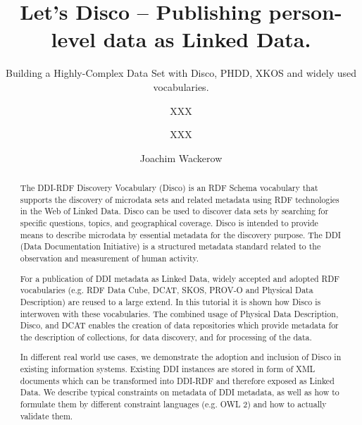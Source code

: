 \documentclass{llncs}
\begin{document}
%
%
\title{Let’s Disco – Publishing person-level data as Linked Data.}
\subtitle{Building a Highly-Complex Data Set with Disco, PHDD, XKOS and widely used vocabularies.
}
%
%
\author{XXX \and XXX \and Joachim Wackerow}
%
%

\maketitle              %

\begin{abstract}
The DDI-RDF Discovery Vocabulary (Disco) is an RDF Schema vocabulary that supports the discovery of microdata sets and related metadata using RDF technologies in the Web of Linked Data. Disco can be used to discover data sets by searching for specific questions, topics, and geographical coverage. Disco is intended to provide means to describe microdata by essential metadata for the discovery purpose. 
The DDI (Data Documentation Initiative) is a structured metadata standard related to the observation and measurement of human activity.

For a publication of DDI metadata as Linked Data, widely accepted and adopted RDF vocabularies (e.g. RDF Data Cube, DCAT, SKOS, PROV-O and Physical Data Description) are reused to a large extend. 
In this tutorial it is shown how Disco is interwoven with these vocabularies. 
The combined usage of Physical Data Description, Disco, and DCAT enables the creation of data repositories which provide metadata for the description of collections, for data discovery, and for processing of the data.
 
In different real world use cases, we demonstrate the adoption and inclusion of Disco in existing information systems. 
Existing DDI instances are stored in form of XML documents which can be transformed into DDI-RDF and therefore exposed as Linked Data.
We describe typical constraints on metadata of DDI metadata, as well as how to formulate them by different constraint languages (e.g. OWL 2) and how to actually validate them.

\end{abstract}
%
\end{document}
